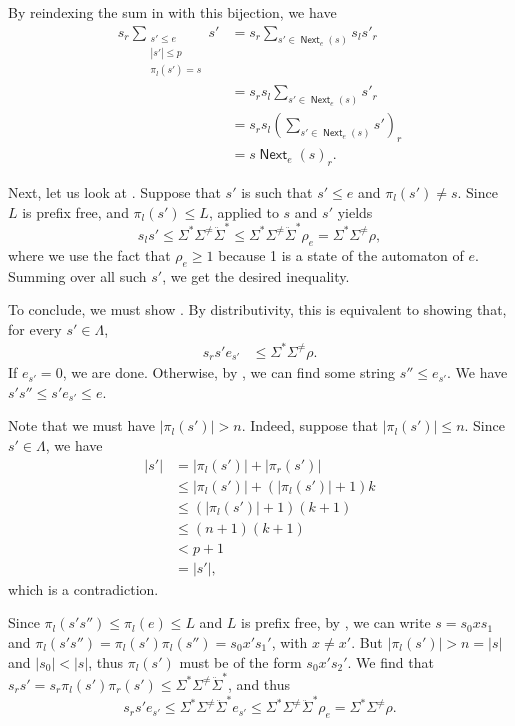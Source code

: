 \documentclass[a4paper,UKenglish,cleveref, autoref, thm-restate]{lipics-v2021}
\DeclareMathOperator{\Next}{\mathsf{Next}}
\begin{document}
\begin{proofEnd}
  By reindexing the sum in  with this
  bijection, we have
  \begin{align*}
    s_r \sum _{\substack{s' \leq e \\ |s'|  \leq  p \\  \pi _l(s') = s}} s'
    & = s_r \sum _{s'  \in  \Next_e(s)} s_ls'_r \\
    & = s_rs_l \sum _{s'  \in  \Next_e(s)} s'_r \\
    & = s_rs_l\left( \sum _{s'  \in  \Next_e(s)} s'\right)_r \\
    & = s \Next_e(s)_r.
  \end{align*}

  Next, let us look at .  Suppose that $s'$
  is such that $s'  \leq  e$ and $ \pi _l(s')  \neq  s$.  Since $L$ is prefix free, and
  $ \pi _l(s')  \leq  L$,  applied to $s$ and $s'$ yields
  \[ s_ls'  \leq   \Sigma ^* \Sigma ^{ \neq }\ddot{ \Sigma }^*  \leq   \Sigma ^* \Sigma ^{ \neq }\ddot{ \Sigma }^* \rho _e =  \Sigma ^* \Sigma ^{ \neq } \rho , \] where we
  use the fact that $ \rho _e  \geq  1$ because 1 is a state of the automaton of $e$.
  Summing over all such $s'$, we get the desired inequality.

  To conclude, we must show .  By
  distributivity, this is equivalent to showing that, for every $s'  \in   \Lambda $,
  \begin{align*}
    s_r s' e_{s'}
    &  \leq   \Sigma ^* \Sigma ^{ \neq } \rho  \label{eq:representable-goal-3}.
  \end{align*}
  If $e_{s'} = 0$, we are done. Otherwise, by
  , we can find some string $s''  \leq  e_{s'}$.
  We have $s's''  \leq  s'e_{s'}  \leq  e$.

  Note that we must have $| \pi _l(s')| > n$.  Indeed, suppose that $| \pi _l(s')|  \leq  n$.
  Since $s'  \in   \Lambda $, we have
  \begin{align*}
    |s'|
    & = | \pi _l(s')|+| \pi _r(s')| \\
    &  \leq  | \pi _l(s')|+(| \pi _l(s')|+1)k \\
    &  \leq  (| \pi _l(s')|+1)(k+1) \\
    &  \leq  (n+1)(k+1) \\
    & < p+1 \\
    & = |s'|,
  \end{align*}
  which is a contradiction.

  Since $ \pi _l(s's'')  \leq   \pi _l(e)  \leq  L$ and $L$ is prefix free, by
  , we can write $s = s_0xs_1$ and
  $ \pi _l(s's'') =  \pi _l(s') \pi _l(s'') = s_0x's_1'$, with $x  \neq  x'$.  But
  $| \pi _l(s')| > n = |s|$ and $|s_0| < |s|$, thus $ \pi _l(s')$ must be of the form
  $s_0x's_2'$.  We find that $s_rs' = s_r \pi _l(s') \pi _r(s')  \leq   \Sigma ^* \Sigma ^{ \neq }\ddot{ \Sigma }^*$,
  and thus
  \[ s_rs'e_{s'}  \leq   \Sigma ^* \Sigma ^{ \neq }\ddot{ \Sigma }^*e_{s'}  \leq   \Sigma ^* \Sigma ^{ \neq }\ddot{ \Sigma }^* \rho _e =
     \Sigma ^* \Sigma ^{ \neq } \rho . \]
\end{proofEnd}
\end{document}
